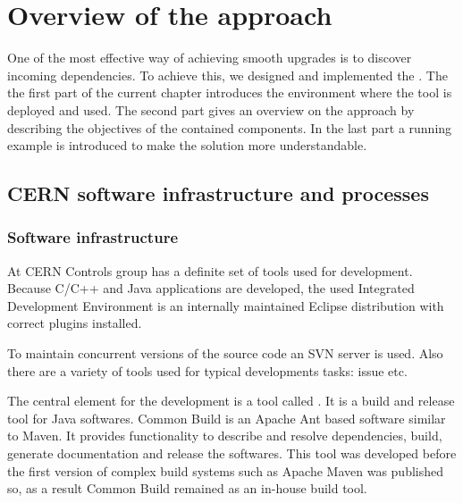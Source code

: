 \chapter{Overview of the approach}

One of the most effective  way of achieving
smooth upgrades is to discover incoming dependencies. To achieve this, we
designed and implemented the \ptool{}. The the first part of the current chapter
introduces the environment where the tool is deployed and used. The second part
gives an overview on the \ptool{} approach by describing the objectives of the
contained components. In the last part a running example is introduced to make
the solution more understandable.


\section{CERN software infrastructure and processes}\label{sect:cerninf}

\subsection{Software infrastructure}

At CERN Controls group has a definite set of tools used for development. Because
C/C++ and Java applications are developed, the used Integrated Development
Environment is an internally maintained Eclipse distribution with correct
plugins installed.

To maintain concurrent versions of the source code an SVN server is used. Also
there are a variety of tools used for typical developments tasks: issue
etc. 

The central element for the development is a tool called 
\cite{CommonBuild}. It is a build and release tool for Java softwares. Common
Build is an Apache Ant based software similar to Maven. It provides
functionality to describe and resolve dependencies, build, generate
documentation and release the softwares. This tool was developed before the
first version of complex build systems such as Apache Maven was published so,
as a result 
Common Build remained as an in-house build tool. 

